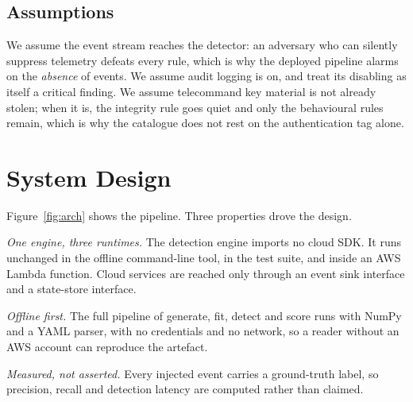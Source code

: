 \documentclass[conference]{IEEEtran}
\begin{document}
\subsection{Assumptions}

We assume the event stream reaches the detector: an adversary who can silently
suppress telemetry defeats every rule, which is why the deployed pipeline alarms
on the \emph{absence} of events. We assume audit logging is on, and treat its
disabling as itself a critical finding. We assume telecommand key material is
not already stolen; when it is, the integrity rule goes quiet and only the
behavioural rules remain, which is why the catalogue does not rest on the
authentication tag alone.

\section{System Design}
\label{sec:design}

Figure~\ref{fig:arch} shows the pipeline. Three properties drove the design.

\emph{One engine, three runtimes.} The detection engine imports no cloud SDK. It
runs unchanged in the offline command-line tool, in the test suite, and inside
an AWS Lambda function. Cloud services are reached only through an event sink
interface and a state-store interface.

\emph{Offline first.} The full pipeline of generate, fit, detect and score
runs with NumPy and a YAML parser, with no credentials and no network, so a
reader without an AWS account can reproduce the artefact.

\emph{Measured, not asserted.} Every injected event carries a ground-truth
label, so precision, recall and detection latency are computed rather than
claimed.
\end{document}
